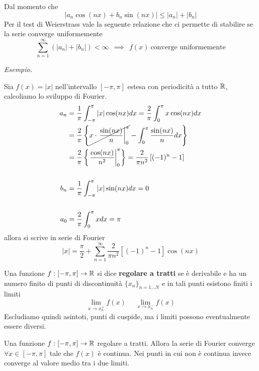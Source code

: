 \begin{rem}
Dal momento che
\begin{equation*}
| a_{n}\cos(nx) + b_{n}\sin(nx)| \leq | a_{n}| + | b_{n}|
\end{equation*}
Per il test di Weierstrass vale la seguente relazione che ci permette di stabilire se la serie converge uniformemente
\begin{equation*}
\sum\limits^{\infty}_{n = 1}(| a_{n}| + | b_{n}|) < \infty \ \ \implies \ \ f(x) \ \text{converge uniformemente}
\end{equation*}
\end{rem}
\textit{Esempio.}

Sia $f(x) = | x| $ nell'intervallo $[ - \pi, \pi]$ estesa con periodicità a tutto $\mathbb{R}$, calcoliamo lo sviluppo di Fourier.
\begin{align*}
a_{n} & = \frac{1}{\pi}\int^{\pi}_{- \pi}| x| \cos(nx) dx = \frac{2}{\pi}\int^{\pi}_{0} x\cos(nx) dx\\
 & = \frac{2}{\pi}\left\{\cancel{x\cdot \left. \frac{\sin(nx)}{n}\right|^{\pi}_{0}} - \int^{\pi}_{0}\frac{\sin(nx)}{n} dx\right\}\\
 & = \frac{2}{\pi}\left\{\left. \frac{\cos(nx)}{n^{2}}\right|^{\pi}_{0}\right\} = \frac{2}{\pi n^{2}}\left[(- 1)^{n} - 1\right]\\
 & \\
b_{n} & = \frac{1}{\pi}\int^{\pi}_{- \pi}| x| \sin(nx) dx = 0\\
 & \\
a_{0} & = \frac{2}{\pi}\int^{\pi}_{0} xdx = \pi
\end{align*}
allora si scrive in serie di Fourier
\begin{equation*}
| x| = \frac{\pi}{2} + \sum\limits^{\infty}_{n = 1}\frac{2}{\pi n^{2}}\left[(- 1)^{n} - 1\right]\cos(nx)
\end{equation*}
\begin{defn}
Una funzione $f: [ - \pi, \pi]\rightarrow \mathbb{R}$ si dice \textbf{regolare a tratti} se è derivabile e ha un numero finito di punti di discontinuità $\{x_{n}\}_{n = 1\dotsc N}$ e in tali punti esistono finiti i limiti
\begin{equation*}
\lim\limits_{x\rightarrow x^{+}_{n}} f(x) \ \ \ \ \ \ \lim\limits_{x\rightarrow x^{-}_{n}} f(x)
\end{equation*}
Escludiamo quindi asintoti, punti di cuspide, ma i limiti possono eventualmente essere diversi.
\end{defn}
\begin{thm}
Una funzione $f: [ - \pi, \pi]\rightarrow \mathbb{R}$ regolare a tratti. Allora la serie di Fourier converge $\forall x\in [ - \pi, \pi]$ tale che $f(x)$ è continua. Nei punti in cui non è continua invece converge al valore medio tra i due limiti.
\end{thm}
